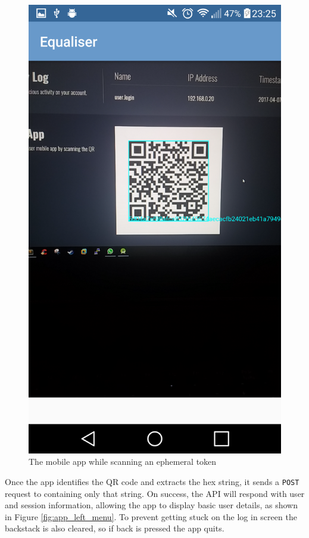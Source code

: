 \documentclass[12pt,a4paper]{bhamdissertation}
\newcommand{\code}[1]{\texttt{#1}}
\begin{document}
\begin{figure}[!htbp]
\begin{minipage}[b]{0.4\textwidth}
    \includegraphics[width=\textwidth]{img/app_qr_scan.png}
    \caption{The mobile app while scanning an ephemeral token}
    \label{fig:app_qr_scan}
  \end{minipage}
  \hspace{0.05\textwidth}
\end{figure}

Once the app identifies the QR code and extracts the hex string, it sends a \code{POST} request to \code{} containing only that string. On success, the API will respond with user and session information, allowing the app to display basic user details, as shown in Figure \ref{fig:app_left_menu}. To prevent getting stuck on the log in screen the backstack is also cleared, so if back is pressed the app quits.
\end{document}
